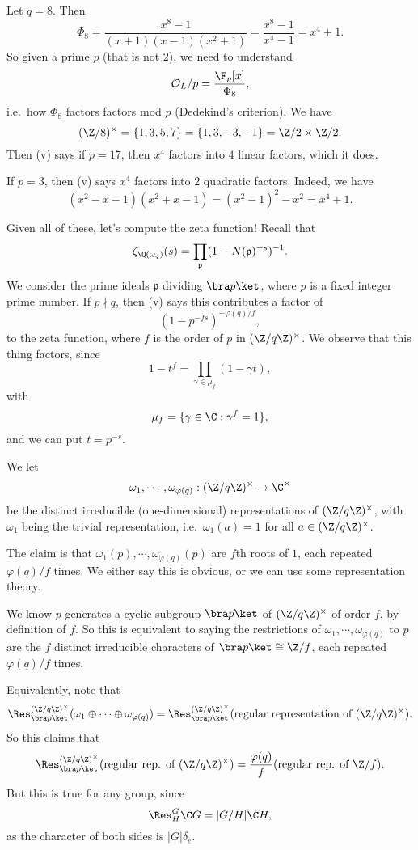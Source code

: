 \documentclass[a4paper]{article}
\begin{document}
\begin{eg}
  Let $q = 8$. Then
  \[
    \Phi_8 = \frac{x^8 - 1}{(x + 1)(x - 1)(x^2 + 1)} = \frac{x^8 - 1}{x^4 - 1} = x^4 + 1.
  \]
  So given a prime $p$ (that is not $2$), we need to understand
  \[
    \mathcal{O}_L/p = \frac{\F_p[x]}{\Phi_8},
  \]
  i.e.\ how $\Phi_8$ factors factors mod $p$ (Dedekind's criterion). We have
  \[
    (\Z/8)^\times = \{1, 3, 5, 7\} = \{1, 3, -3, -1\} = \Z/2 \times \Z/2.
  \]
  Then (v) says if $p = 17$, then $x^4$ factors into $4$ linear factors, which it does.

  If $p = 3$, then (v) says $x^4$ factors into $2$ quadratic factors. Indeed, we have
  \[
    (x^2 - x - 1)(x^2 + x - 1) = (x^2 - 1)^2 - x^2 = x^4 + 1.
  \]
\end{eg}

Given all of these, let's compute the zeta function! Recall that
\[
  \zeta_{\Q(\omega_q)}(s) = \prod_{\mathfrak{p}}(1 - N(\mathfrak{p})^{-s})^{-1}.
\]
We consider the prime ideals $\mathfrak{p}$ dividing $\bra p\ket$, where $p$ is a fixed integer prime number. If $p \nmid q$, then (v) says this contributes a factor of
\[
  (1 - p^{-fs})^{-\varphi(q)/f},
\]
to the zeta function, where $f$ is the order of $p$ in $(\Z/q\Z)^\times$. We observe that this thing factors, since
\[
  1 - t^f = \prod_{\gamma \in \mu_f}(1 - \gamma t),
\]
with
\[
  \mu_f = \{\gamma \in \C: \gamma^f = 1\},
\]
and we can put $t = p^{-s}$.

We let
\[
  \omega_1, \cdots, \omega_{\varphi(q)}: (\Z/q\Z)^\times \to \C^\times
\]
be the distinct irreducible (one-dimensional) representations of $(\Z/q\Z)^\times$, with $\omega_1$ being the trivial representation, i.e.\ $\omega_1(a) = 1$ for all $a \in (\Z/q\Z)^\times$.

The claim is that $\omega_1(p), \cdots, \omega_{\varphi(q)}(p)$ are $f$th roots of $1$, each repeated $\varphi(q)/f$ times. We either say this is obvious, or we can use some representation theory.

We know $p$ generates a cyclic subgroup $\bra p\ket$ of $(\Z/q\Z)^\times$ of order $f$, by definition of $f$. So this is equivalent to saying the restrictions of $\omega_1, \cdots, \omega_{\varphi(q)}$ to $p$ are the $f$ distinct irreducible characters of $\bra p\ket \cong \Z/f$, each repeated $\varphi(q)/f$ times.

Equivalently, note that
\[
  \Res^{(\Z/q\Z)^\times}_{\bra p\ket} (\omega_1 \oplus \cdots \oplus \omega_{\varphi(q)}) = \Res_{\bra p\ket}^{(\Z/q\Z)^\times}(\text{regular representation of }(\Z/q\Z)^\times).
\]
So this claims that
\[
  \Res_{\bra p\ket}^{(\Z/q\Z)^\times} (\text{regular rep. of }(\Z/q\Z)^\times) = \frac{\varphi(q)}{f} (\text{regular rep. of }\Z/f).
\]
But this is true for any group, since
\[
  \Res_H^G \C G = |G/H| \C H,
\]
as the character of both sides is $|G| \delta_e$.
\end{document}
